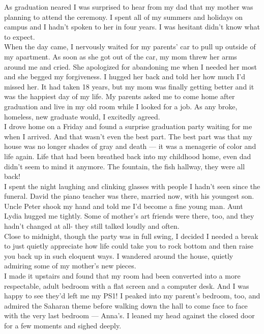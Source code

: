 \documentclass[a5paper]{scrartcl}
\begin{document}
As graduation neared I was surprised to hear from my dad that my mother was planning to attend the ceremony.  I spent all of my summers and holidays on campus and I hadn't spoken to her in four years. I was hesitant didn't know what to expect.\\


When the day came, I nervously waited for my parents' car to pull up outside of my apartment. As soon as she got out of the car, my mom threw her arms around me and cried. She apologized for abandoning me when I needed her most and she begged my forgiveness. I hugged her back and told her how much I'd missed her. It had taken 18 years, but my mom was finally getting better and it was the happiest day of my life. My parents asked me to come home after graduation and live in my old room while I looked for a job. As any broke, homeless, new graduate would, I excitedly agreed.\\


I drove home on a Friday and found a surprise graduation party waiting for me when I arrived. And that wasn't even the best part. The best part was that my house was no longer shades of gray and death --- it was a menagerie of color and life again. Life that had been breathed back into my childhood home, even dad didn't seem to mind it anymore. The fountain, the fish hallway, they were all back! \\


I spent the night laughing and clinking glasses with people I hadn't seen since the funeral. David the piano teacher was there, married now, with his youngest son. Uncle Peter shook my hand and told me I'd become a fine young man. Aunt Lydia hugged me tightly. Some of mother's art friends were there, too, and they hadn't changed at all- they still talked loudly and often. \\


Close to midnight, though the party was in full swing, I decided I needed a break to just quietly appreciate how life could take you to rock bottom and then raise you back up in such eloquent ways.  I wandered around the house, quietly admiring some of my mother's new pieces.\\


I made it upstairs and found that my room had been converted into a more respectable, adult bedroom with a flat screen and a computer desk. And I was happy to see they'd left me my PS1! I peaked into my parent's bedroom, too, and admired the Saharan theme before walking down the hall to come face to face with the very last bedroom --- Anna's. I leaned my head against the closed door for a few moments and sighed deeply.\\
\end{document}
